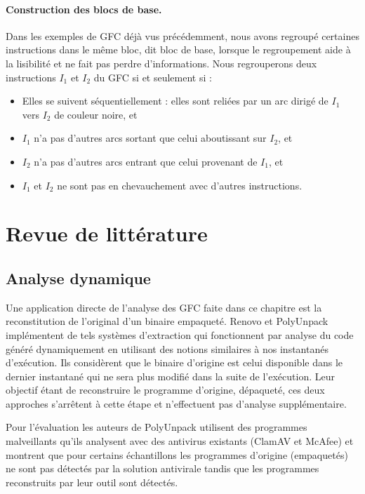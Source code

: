 \paragraph{Construction des blocs de base.}
Dans les exemples de GFC déjà vus précédemment, nous avons regroupé certaines instructions dans le même bloc, dit bloc de base, lorsque le regroupement aide à la lisibilité et ne fait pas perdre d'informations. Nous regrouperons deux instructions $I_1$ et $I_2$ du GFC si et seulement si :
\begin{itemize}
 \item Elles se suivent séquentiellement : elles sont reliées par un arc dirigé de $I_1$ vers $I_2$ de couleur noire, et
 \item $I_1$ n'a pas d'autres arcs sortant que celui aboutissant sur $I_2$, et
 \item $I_2$ n'a pas d'autres arcs entrant que celui provenant de $I_1$, et
 \item $I_1$ et $I_2$ ne sont pas en chevauchement avec d'autres instructions.
\end{itemize}

\section{Revue de littérature}
\subsection{Analyse dynamique}
Une application directe de l'analyse des GFC faite dans ce chapitre est la reconstitution de l'original d'un binaire empaqueté.
Renovo \cite{renovo} et PolyUnpack \cite{polyunpack} implémentent de tels systèmes d'extraction qui fonctionnent par analyse du code généré dynamiquement en utilisant des notions similaires à nos instantanés d'exécution. Ils considèrent que le binaire d'origine est celui disponible dans le dernier instantané qui ne sera plus modifié dans la suite de l'exécution.
Leur objectif étant de reconstruire le programme d'origine, dépaqueté, ces deux approches s'arrêtent à cette étape et n'effectuent pas d'analyse supplémentaire. 

Pour l'évaluation les auteurs de PolyUnpack utilisent des programmes malveillants qu'ils analysent avec des antivirus existants (ClamAV et McAfee) et montrent que pour certains échantillons les programmes d'origine (empaquetés) ne sont pas détectés par la solution antivirale tandis que les programmes reconstruits par leur outil sont détectés.


